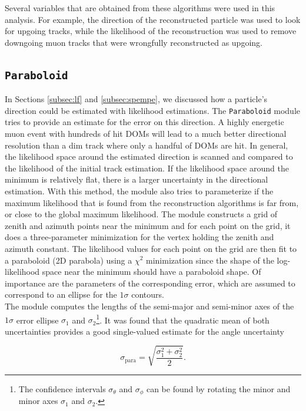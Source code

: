 \noindent Several variables that are obtained from these algorithms were used in this analysis. For example, the direction of the reconstructed particle was used to look for upgoing tracks, while the likelihood of the reconstruction was used to remove downgoing muon tracks that were wrongfully reconstructed as upgoing.

\subsection{\texttt{Paraboloid}}
\label{subsec:paraboloid}

In Sections \ref{subsec:lf} and \ref{subsec:spempe}, we discussed how a particle's direction could be estimated with likelihood estimations. The \texttt{Paraboloid} module tries to provide an estimate for the error on this direction. A highly energetic muon event with hundreds of hit DOMs will lead to a much better directional resolution than a dim track where only a handful of DOMs are hit. In general, the likelihood space around the estimated direction is scanned and compared to the likelihood of the initial track estimation. If the likelihood space around the minimum is relatively flat, there is a larger uncertainty in the directional estimation. With this method, the module also tries to parameterize if the maximum likelihood that is found from the reconstruction algorithms is far from, or close to the global maximum likelihood. The module constructs a grid of zenith and azimuth points near the minimum and for each point on the grid, it does a three-parameter minimization for the vertex holding the zenith and azimuth constant. The likelihood values for each point on the grid are then fit to a paraboloid (2D parabola) using a $\chi^2$ minimization since the shape of the log-likelihood space near the minimum should have a paraboloid shape. Of importance are the parameters of the corresponding error, which are assumed to correspond to an ellipse for the $1\sigma$ contours.\\

\noindent The module computes the lengths of the semi-major and semi-minor axes of the $1\sigma$ error ellipse $\sigma_1$ and $\sigma_2$\footnote{The confidence intervals $\sigma_\theta$ and $\sigma_\phi$ can be found by rotating the minor and minor axes $\sigma_1$ and $\sigma_2$.}. It was found that the quadratic mean of both uncertainties provides a good single-valued estimate for the angle uncertainty

\begin{equation}
\label{eq:paraboloid}
\sigma_\textrm{para} = \sqrt{\frac{\sigma_1^2 + \sigma_2^2}{2}}.
\end{equation}

